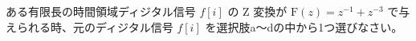 ある有限長の時間領域ディジタル信号 $f[i]$ の Z 変換が $\textrm{F}(z) = z^{-1} + z^{-3}$ で与えられる時、元のディジタル信号 $f[i]$ を選択肢a〜dの中から1つ選びなさい。
